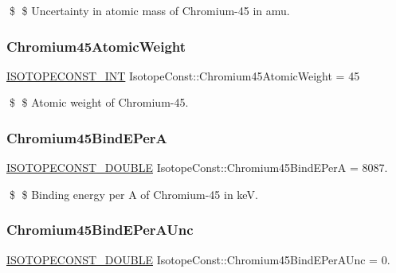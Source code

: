 \$ \$ Uncertainty in atomic mass of Chromium-\/45 in amu. \mbox{\label{group___isotope_const-_chromium-_cr45_ga0d035dff72b087c15ead872773205821}} 
\subsubsection{\texorpdfstring{Chromium45\+Atomic\+Weight}{Chromium45AtomicWeight}}
{\footnotesize\ttfamily \mbox{\hyperlink{group___isotope_const-_macros_ga5f18360b3e99483a35c32d789e62621c}{I\+S\+O\+T\+O\+P\+E\+C\+O\+N\+S\+T\+\_\+\+I\+NT}} Isotope\+Const\+::\+Chromium45\+Atomic\+Weight = 45}

\$ \$ Atomic weight of Chromium-\/45. \mbox{\label{group___isotope_const-_chromium-_cr45_gafa63603373b7acfdc89dea3988980ef2}} 
\subsubsection{\texorpdfstring{Chromium45\+Bind\+E\+PerA}{Chromium45BindEPerA}}
{\footnotesize\ttfamily \mbox{\hyperlink{group___isotope_const-_macros_ga8f45a7272ce02c0b4c65c44636ed719a}{I\+S\+O\+T\+O\+P\+E\+C\+O\+N\+S\+T\+\_\+\+D\+O\+U\+B\+LE}} Isotope\+Const\+::\+Chromium45\+Bind\+E\+PerA = 8087.}

\$ \$ Binding energy per A of Chromium-\/45 in keV. \mbox{\label{group___isotope_const-_chromium-_cr45_ga56c0de0b7f91298fe06bdc3ff9a4e78e}} 
\subsubsection{\texorpdfstring{Chromium45\+Bind\+E\+Per\+A\+Unc}{Chromium45BindEPerAUnc}}
{\footnotesize\ttfamily \mbox{\hyperlink{group___isotope_const-_macros_ga8f45a7272ce02c0b4c65c44636ed719a}{I\+S\+O\+T\+O\+P\+E\+C\+O\+N\+S\+T\+\_\+\+D\+O\+U\+B\+LE}} Isotope\+Const\+::\+Chromium45\+Bind\+E\+Per\+A\+Unc = 0.}


